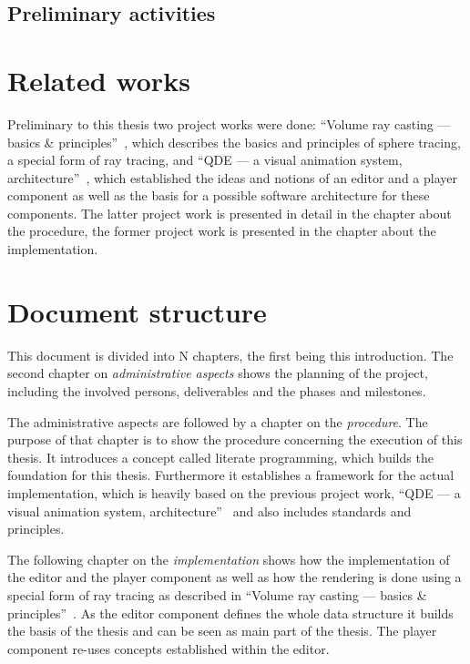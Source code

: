 \documentclass[
    a4paper,      %
    10pt,         %
    openright,    %
    notitlepage,  %
    parskip=half, %
]{scrreprt}       %
\theoremstyle{definition}                    %
\begin{document}
\subsection{Preliminary activities}
\label{subsec:preliminary}

\blindtext{}

\section{Related works}
\label{sec:related-works}

Preliminary to this thesis two project works were done: ``Volume
ray casting --- basics \& principles''~\cite{osterwalder_volume_2016}, which
describes the basics and principles of sphere tracing, a special form of ray
tracing, and ``QDE --- a visual animation system,
architecture''~\cite{osterwalder_qde_2016}, which established the ideas and
notions of an editor and a player component as well as the basis for a possible
software architecture for these components. The latter project work is presented
in detail in the chapter about the procedure, the former project work is
presented in the chapter about the implementation.

\section{Document structure}
\label{sec:document-structure}

This document is divided into N chapters, the first being this introduction. The
second chapter on \textit{administrative aspects} shows the planning of the
project, including the involved persons, deliverables and the phases and
milestones.

The administrative aspects are followed by a chapter on the \textit{procedure}.
The purpose of that chapter is to show the procedure concerning the execution of
this thesis. It introduces a concept called literate programming, which builds
the foundation for this thesis. Furthermore it establishes a framework for the
actual implementation, which is heavily based on the previous project work,
``QDE --- a visual animation system, architecture''~\cite{osterwalder_qde_2016}
and also includes standards and principles.

The following chapter on the \textit{implementation} shows how the
implementation of the editor and the player component as well as how the
rendering is done using a special form of ray tracing as described in ``Volume
ray casting --- basics \& principles''~\cite{osterwalder_volume_2016}. As the
editor component defines the whole data structure it builds the basis of the
thesis and can be seen as main part of the thesis. The player component re-uses
concepts established within the editor.
\end{document}
